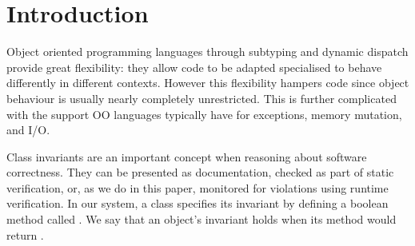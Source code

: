 \section{Introduction}
\label{s:intro}

Object oriented programming languages through subtyping and dynamic dispatch provide great flexibility: they
allow code to be adapted  specialised to behave differently in different contexts.
However this flexibility hampers code  since object behaviour is usually nearly completely
unrestricted. This is further complicated with the support OO languages typically have for exceptions,
memory mutation, and I/O.


Class invariants are an important concept when reasoning about software correctness.
They can be presented as documentation, checked as part of static verification, or, as we do in this paper, monitored for violations using runtime verification.
In our system, a class specifies its invariant by defining a boolean method called \Q@invariant@.
We say that an object's invariant holds when its \Q@invariant@ method would return \Q@true@.

